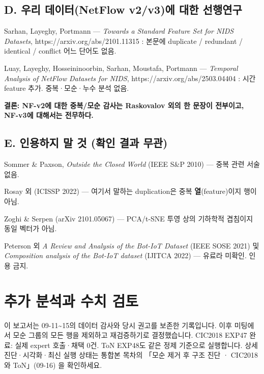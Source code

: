 \subsection{D. 우리 데이터(NetFlow v2/\allowbreak{}v3)에 대한 선행연구}
\par\noindent \textbullet\enspace Sarhan, Layeghy, Portmann — \emph{Towards a Standard Feature Set for NIDS Datasets}, https:/\allowbreak{}/\allowbreak{}arxiv.org/\allowbreak{}abs/\allowbreak{}2101.11315 : 본문에 duplicate /\allowbreak{} redundant /\allowbreak{} identical /\allowbreak{} conflict 어느 단어도 없음.


\par\noindent \textbullet\enspace Luay, Layeghy, Hosseininoorbin, Sarhan, Moustafa, Portmann — \emph{Temporal Analysis of NetFlow Datasets for NIDS}, https:/\allowbreak{}/\allowbreak{}arxiv.org/\allowbreak{}abs/\allowbreak{}2503.04404 : 시간 feature 추가. 중복·모순·누수 분석 없음.


\par\noindent \textbullet\enspace \textbf{결론: NF-v2에 대한 중복/\allowbreak{}모순 감사는 Raskovalov 외의 한 문장이 전부이고, NF-v3에 대해서는 전무하다.}


\subsection{E. 인용하지 말 것 (확인 결과 무관)}
\par\noindent \textbullet\enspace Sommer \& Paxson, \emph{Outside the Closed World} (IEEE S\&P 2010) — 중복 관련 서술 없음.


\par\noindent \textbullet\enspace Rosay 외 (ICISSP 2022) — 여기서 말하는 duplication은 중복 \textbf{열}(feature)이지 행이 아님.


\par\noindent \textbullet\enspace Zoghi \& Serpen (arXiv 2101.05067) — PCA/\allowbreak{}t-SNE 투영 상의 기하학적 겹침이지 동일 벡터가 아님.


\par\noindent \textbullet\enspace Peterson 외 \emph{A Review and Analysis of the Bot-IoT Dataset} (IEEE SOSE 2021) 및 \emph{Composition analysis of the Bot-IoT dataset} (IJITCA 2022) — 유료라 미확인. 인용 금지.




\section{추가 분석과 수치 검토}
이 보고서는 09-11\textasciitilde{}15의 데이터 감사와 당시 권고를 보존한 기록입니다. 이후 미팅에서 모순 그룹의 모든 행을 제외하고 재검증하기로 결정했습니다. CIC2018 EXP47 완료: 실제 expert 호출·채택 0건. ToN EXP48도 같은 정제 기준으로 실행합니다. 상세 진단·시각화·최신 실행 상태는 통합본 목차의 「모순 제거 후 구조 진단 · CIC2018와 ToN」(09-16) 을 확인하세요.

